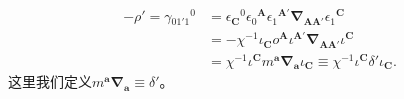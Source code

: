\begin{equation*}
	\begin{aligned}
		-\rho '=\gamma {_{01'1}}^{0} & =\epsilon {_{\boldsymbol{C}}}^{0} \epsilon {_{0}}^{\boldsymbol{A}} \epsilon {_{1}}^{\boldsymbol{A} '}\mathbf{\nabla }_{\boldsymbol{AA} '} \epsilon {_{1}}^{\boldsymbol{C}}\\
		& =-\chi ^{-1} \iota _{\boldsymbol{C}} o^{\boldsymbol{A}} \iota ^{\boldsymbol{A} '}\mathbf{\nabla }_{\boldsymbol{AA} '} \iota ^{\boldsymbol{C}}\\
		& =\chi ^{-1} \iota ^{\boldsymbol{C}} m^{\boldsymbol{a}}\mathbf{\nabla }_{\boldsymbol{a}} \iota _{\boldsymbol{C}} \equiv \chi ^{-1} \iota ^{\boldsymbol{C}} \delta '\iota _{\boldsymbol{C}} .
	\end{aligned}
\end{equation*}
这里我们定义$m^{\boldsymbol{a}}\boldsymbol{\nabla }_{\boldsymbol{a}} \equiv \delta '$。

